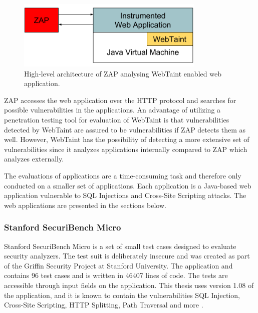 \begin{figure}[H]
    \centering
    \includegraphics[width=0.8\textwidth]{images/ZAPArchitecture.png}
    \caption{High-level architecture of ZAP analysing WebTaint enabled web application.}
    \label{fig:ZAP}
\end{figure}

ZAP accesses the web application over the HTTP protocol and searches for possible vulnerabilities in the applications. An advantage of utilizing a penetration testing tool for evaluation of WebTaint is that vulnerabilities detected by WebTaint are assured to be vulnerabilities if ZAP detects them as well. However, WebTaint has the possibility of detecting a more extensive set of vulnerabilities since it analyzes applications internally compared to ZAP which analyzes externally.

The evaluations of applications are a time-consuming task and therefore only conducted on a smaller set of applications. Each application is a Java-based web application vulnerable to SQL Injections and Cross-Site Scripting attacks. The web applications are presented in the sections below.



\subsubsection{Stanford SecuriBench Micro}
Stanford SecuriBench Micro is a set of small test cases designed to evaluate security analyzers. The test suit is deliberately insecure and was created as part of the Griffin Security Project \parencite{griffin} at Stanford University. The application and contains 96 test cases and is written in 46407 lines of code. The tests are accessible through input fields on the application. This thesis uses version 1.08 of the application, and it is known to contain the vulnerabilities SQL Injection, Cross-Site Scripting, HTTP Splitting, Path Traversal and more \parencite{securiBenchMicro, microfaq}. 



